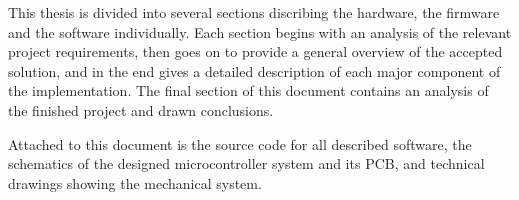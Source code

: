 This thesis is divided into several sections discribing the hardware, the
firmware and the software individually. Each section begins with an analysis
of the relevant project requirements, then goes on to provide a general
overview of the accepted solution, and in the end gives a detailed description
of each major component of the implementation. The final section of this
document contains an analysis of the finished project and drawn conclusions.

Attached to this document is the source code for all described software, the
schematics of the designed microcontroller system and its PCB, and technical
drawings showing the mechanical system.
